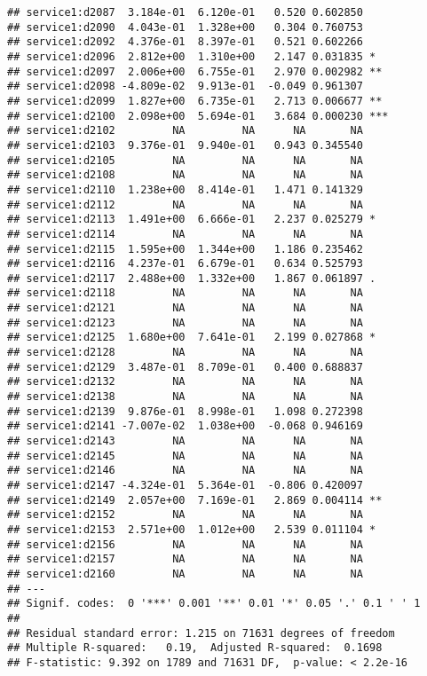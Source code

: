 \documentclass[
]{article}
\begin{document}
\begin{verbatim}
## service1:d2087  3.184e-01  6.120e-01   0.520 0.602850    
## service1:d2090  4.043e-01  1.328e+00   0.304 0.760753    
## service1:d2092  4.376e-01  8.397e-01   0.521 0.602266    
## service1:d2096  2.812e+00  1.310e+00   2.147 0.031835 *  
## service1:d2097  2.006e+00  6.755e-01   2.970 0.002982 ** 
## service1:d2098 -4.809e-02  9.913e-01  -0.049 0.961307    
## service1:d2099  1.827e+00  6.735e-01   2.713 0.006677 ** 
## service1:d2100  2.098e+00  5.694e-01   3.684 0.000230 ***
## service1:d2102         NA         NA      NA       NA    
## service1:d2103  9.376e-01  9.940e-01   0.943 0.345540    
## service1:d2105         NA         NA      NA       NA    
## service1:d2108         NA         NA      NA       NA    
## service1:d2110  1.238e+00  8.414e-01   1.471 0.141329    
## service1:d2112         NA         NA      NA       NA    
## service1:d2113  1.491e+00  6.666e-01   2.237 0.025279 *  
## service1:d2114         NA         NA      NA       NA    
## service1:d2115  1.595e+00  1.344e+00   1.186 0.235462    
## service1:d2116  4.237e-01  6.679e-01   0.634 0.525793    
## service1:d2117  2.488e+00  1.332e+00   1.867 0.061897 .  
## service1:d2118         NA         NA      NA       NA    
## service1:d2121         NA         NA      NA       NA    
## service1:d2123         NA         NA      NA       NA    
## service1:d2125  1.680e+00  7.641e-01   2.199 0.027868 *  
## service1:d2128         NA         NA      NA       NA    
## service1:d2129  3.487e-01  8.709e-01   0.400 0.688837    
## service1:d2132         NA         NA      NA       NA    
## service1:d2138         NA         NA      NA       NA    
## service1:d2139  9.876e-01  8.998e-01   1.098 0.272398    
## service1:d2141 -7.007e-02  1.038e+00  -0.068 0.946169    
## service1:d2143         NA         NA      NA       NA    
## service1:d2145         NA         NA      NA       NA    
## service1:d2146         NA         NA      NA       NA    
## service1:d2147 -4.324e-01  5.364e-01  -0.806 0.420097    
## service1:d2149  2.057e+00  7.169e-01   2.869 0.004114 ** 
## service1:d2152         NA         NA      NA       NA    
## service1:d2153  2.571e+00  1.012e+00   2.539 0.011104 *  
## service1:d2156         NA         NA      NA       NA    
## service1:d2157         NA         NA      NA       NA    
## service1:d2160         NA         NA      NA       NA    
## ---
## Signif. codes:  0 '***' 0.001 '**' 0.01 '*' 0.05 '.' 0.1 ' ' 1
## 
## Residual standard error: 1.215 on 71631 degrees of freedom
## Multiple R-squared:   0.19,  Adjusted R-squared:  0.1698 
## F-statistic: 9.392 on 1789 and 71631 DF,  p-value: < 2.2e-16
\end{verbatim}
\end{document}
